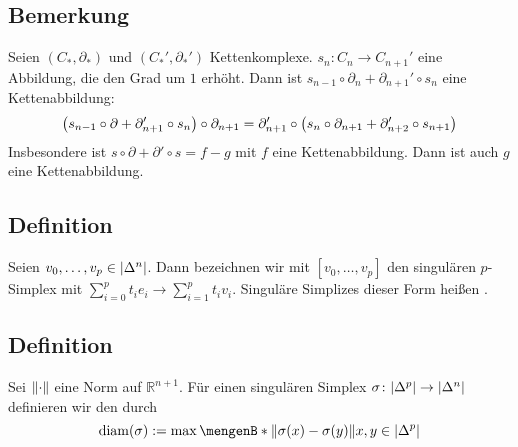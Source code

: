 \subsection{Bemerkung} %
\label{sub:1313}
Seien $(C_*,\partial_*)$ und $(C_*',\partial_*')$ Kettenkomplexe. $s_n \colon C_n \to C_{n+1}'$ eine Abbildung, die den Grad um $1$ erhöht. Dann ist $s_{n-1} \circ \partial_n + \partial_{n+1}' \circ s_n$ eine Kettenabbildung:
\[
	\enbrace*{s_{n-1} \circ \partial + \partial_{n+1}' \circ s_n} \circ \partial_{n+1} = \partial_{n+1}' \circ  \enbrace*{s_n \circ \partial_{n+1} + \partial_{n+2}' \circ s_{n+1}}  
\]
Insbesondere ist $s \circ \partial + \partial' \circ s = f -g$ mit $f$ eine Kettenabbildung. Dann ist auch $g$ eine Kettenabbildung. 

\subsection[Definition: Affiner singulärer Simplex]{Definition} %
\label{sub:1314}
Seien $v_0, \ldots ,v_p \in \abs*{\Delta^n}$. Dann bezeichnen wir mit $[v_0,\ldots ,v_p]$ den singulären $p$-Simplex mit $\sum_{i=0}^{p} t_i e_i \to \sum_{i=1}^{p} t_i v_i$.
Singuläre Simplizes dieser Form heißen . 

\subsection[Definition: Durchmesser eines Simplizes]{Definition} %
\label{sub:1315}
Sei $\norm{\cdot}$ eine Norm auf $\mathds{R}^{n+1}$. Für einen singulären Simplex $\sigma \colon \abs*{\Delta^p} \to \abs*{\Delta^n}$ definieren wir den 
durch
\[
	\diam(\sigma) := \max \set[\norm{\sigma(x)- \sigma(y)} ]{x,y \in \abs*{\Delta^p}} 
\]

